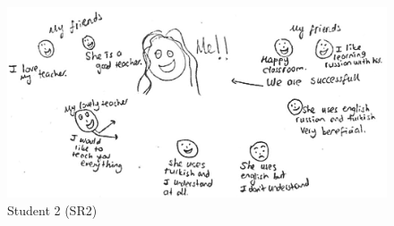 \documentclass[output=paper]{../langscibook}
\begin{document}
\begin{figure}
\includegraphics[width=.75\textwidth]{figures/a4-img004.png}
\caption{Student 2 (SR2)\label{fig:4:4}}
\end{figure}

{\sloppy\printbibliography[heading=subbibliography,notkeyword=this]}
\end{document}
